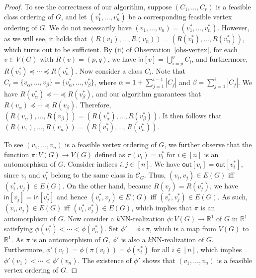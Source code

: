 \documentclass[11pt]{article}
\begin{document}
\begin{proof}
To see the correctness of our algorithm, suppose $(C_1,\dots,C_r)$ is a feasible class ordering of $G$, and let $(v_1^*,\dots,v_n^*)$ be a corresponding feasible vertex ordering of $G$.
We do not necessarily have $(v_1,\dots,v_n) = (v_1^*,\dots,v_n^*)$.
However, as we will see, it holds that $(R(v_1),\dots,R(v_n)) = (R(v_1^*),\dots,R(v_n^*))$, which turns out to be sufficient.
By (ii) of Observation~\ref{obs-vertex}, for each $v \in V(G)$ with $R(v) = (p,q)$, we have $\mathsf{in}[v] = \bigcup_{i=p}^q C_i$, and furthermore, $R(v_1^*) \preceq \cdots \preceq R(v_n^*)$.
Now consider a class $C_i$.
Note that $C_i = \{v_\alpha,\dots,v_\beta\} = \{v_\alpha^*,\dots,v_\beta^*\}$, where $\alpha = 1+\sum_{j=1}^{i-1} |C_j|$ and $\beta = \sum_{j=1}^i |C_j|$.
We have $R(v_\alpha^*) \preceq \cdots \preceq R(v_\beta^*)$, and our algorithm guarantees that $R(v_\alpha) \preceq \cdots \preceq R(v_\beta)$.
Therefore, $(R(v_\alpha),\dots,R(v_\beta)) = (R(v_\alpha^*),\dots,R(v_\beta^*))$.
It then follows that $(R(v_1),\dots,R(v_n)) = (R(v_1^*),\dots,R(v_n^*))$.

To see $(v_1,\dots,v_n)$ is a feasible vertex ordering of $G$, we further observe that the function $\pi:V(G) \rightarrow V(G)$ defined as $\pi(v_i) = v_i^*$ for $i \in [n]$ is an automorphism of $G$.
Consider indices $i,j \in [n]$.
We have $\mathsf{out}[v_i] = \mathsf{out}[v_i^*]$, since $v_i$ and $v_i^*$ belong to the same class in $\mathcal{C}_G$.
Thus, $(v_i,v_j) \in E(G)$ iff $(v_i^*,v_j) \in E(G)$.
On the other hand, because $R(v_j) = R(v_j^*)$, we have $\mathsf{in}[v_j] = \mathsf{in}[v_j^*]$ and hence $(v_i^*,v_j) \in E(G)$ iff $(v_i^*,v_j^*) \in E(G)$.
As such, $(v_i,v_j) \in E(G)$ iff $(v_i^*,v_j^*) \in E(G)$, which implies that $\pi$ is an automorphism of $G$.
Now consider a $k$NN-realization $\phi:V(G) \rightarrow \mathbb{R}^1$ of $G$ in $\mathbb{R}^1$ satisfying $\phi(v_1^*) < \cdots < \phi(v_n^*)$.
Set $\phi' = \phi \circ \pi$, which is a map from $V(G)$ to $\mathbb{R}^1$.
As $\pi$ is an automorphism of $G$, $\phi'$ is also a $k$NN-realization of $G$.
Furthermore, $\phi'(v_i) = \phi(\pi(v_i)) = \phi(v_i^*)$ for all $i \in [n]$, which implies $\phi'(v_1) < \cdots < \phi'(v_n)$.
The existence of $\phi'$ shows that $(v_1,\dots,v_n)$ is a feasible vertex ordering of $G$.
\end{proof}
\end{document}
